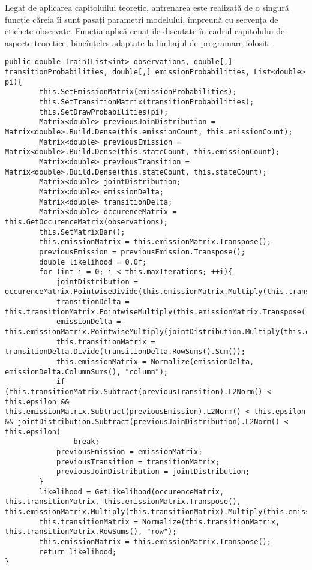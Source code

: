 Legat de aplicarea capitoluilui teoretic, antrenarea este realizată de o singură funcție căreia îi sunt pasați parametri modelului, împreună cu secvența de etichete observate. Funcția aplică ecuațiile discutate în cadrul capitolului de aspecte teoretice, bineînțeles adaptate la limbajul de programare folosit.\par

\begin{lstlisting}[caption=Implementare algoritmului de antrenare a modelului]
public double Train(List<int> observations, double[,] transitionProbabilities, double[,] emissionProbabilities, List<double> pi){
        this.SetEmissionMatrix(emissionProbabilities);
        this.SetTransitionMatrix(transitionProbabilities);
        this.SetDrawProbabilities(pi);
        Matrix<double> previousJoinDistribution = Matrix<double>.Build.Dense(this.emissionCount, this.emissionCount);
        Matrix<double> previousEmission = Matrix<double>.Build.Dense(this.stateCount, this.emissionCount);
        Matrix<double> previousTransition = Matrix<double>.Build.Dense(this.stateCount, this.stateCount);
        Matrix<double> jointDistribution;
        Matrix<double> emissionDelta;
        Matrix<double> transitionDelta;
        Matrix<double> occurenceMatrix = this.GetOccurenceMatrix(observations);
        this.SetMatrixBar();
        this.emissionMatrix = this.emissionMatrix.Transpose();
        previousEmission = previousEmission.Transpose();
        double likelihood = 0.0f;
        for (int i = 0; i < this.maxIterations; ++i){
            jointDistribution = occurenceMatrix.PointwiseDivide(this.emissionMatrix.Multiply(this.transitionMatrix).Multiply(this.emissionMatrix.Transpose()));
            transitionDelta = this.transitionMatrix.PointwiseMultiply(this.emissionMatrix.Transpose().Multiply(jointDistribution).Multiply(this.emissionMatrix));
            emissionDelta = this.emissionMatrix.PointwiseMultiply(jointDistribution.Multiply(this.emissionMatrix).Multiply(this.transitionMatrix.Transpose()).Add(jointDistribution.Transpose().Multiply(this.emissionMatrix).Multiply(this.transitionMatrix)));
            this.transitionMatrix = transitionDelta.Divide(transitionDelta.RowSums().Sum());
            this.emissionMatrix = Normalize(emissionDelta, emissionDelta.ColumnSums(), "column");
            if (this.transitionMatrix.Subtract(previousTransition).L2Norm() < this.epsilon && this.emissionMatrix.Subtract(previousEmission).L2Norm() < this.epsilon && jointDistribution.Subtract(previousJoinDistribution).L2Norm() < this.epsilon)
                break;
            previousEmission = emissionMatrix;
            previousTransition = transitionMatrix;
            previousJoinDistribution = jointDistribution;
        }
        likelihood = GetLikelihood(occurenceMatrix, this.transitionMatrix, this.emissionMatrix.Transpose(), this.emissionMatrix.Multiply(this.transitionMatrix).Multiply(this.emissionMatrix.Transpose()));
        this.transitionMatrix = Normalize(this.transitionMatrix, this.transitionMatrix.RowSums(), "row");
        this.emissionMatrix = this.emissionMatrix.Transpose();
        return likelihood;
}
\end{lstlisting}

